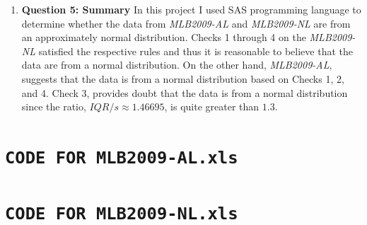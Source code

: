 \documentclass[10pt,a4paper]{article}
\begin{document}
\begin{enumerate}
		\item \textbf{Question 5: Summary} \newline
			In this project I used SAS programming language to determine whether the data from \textit{MLB2009-AL} and \textit{MLB2009-NL} are from an approximately normal distribution. Checks 1 through 4 on the \textit{MLB2009-NL} satisfied the respective rules and thus it is reasonable to believe that the data are from a normal distribution. On the other hand, \textit{MLB2009-AL}, suggests that the data is from a normal distribution based on Checks 1, 2, and 4. \newline
			Check 3, provides doubt that the data is from a normal distribution since the ratio, $ IQR/s \approx 1.46695 $, is quite greater than $ 1.3 $. 
		
	\end{enumerate}
	
	\clearpage
	
	\begingroup
	\section{\texttt{CODE FOR MLB2009-AL.xls}}
		
		
	\endgroup
	
	
	\begingroup
		\section{\texttt{CODE FOR MLB2009-NL.xls}}
		
		
	\endgroup
\end{document}
